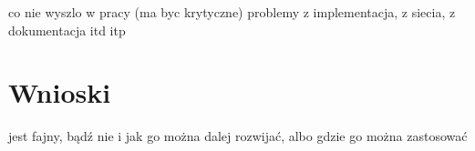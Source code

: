 \documentclass[journal]{IEEEtran}
\begin{document}
co nie wyszlo w pracy (ma byc krytyczne) problemy z implementacja, z siecia, z dokumentacja itd itp

\section{Wnioski}
 jest fajny, bądź nie i jak go można dalej rozwijać, albo gdzie go można zastosować






%


\ifCLASSOPTIONcaptionsoff
  \newpage
\fi



\end{document}
